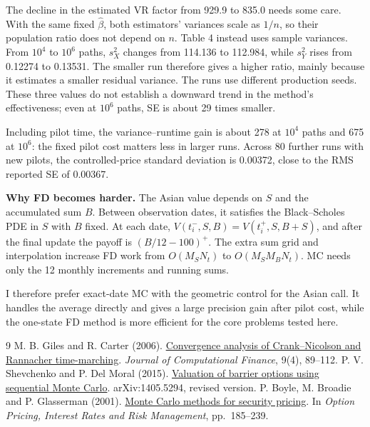 \documentclass[12pt]{article}
\theoremstyle{definition}
\begin{document}
The decline in the estimated VR factor from 929.9 to 835.0 needs some care.
With the same fixed $\widehat\beta$, both estimators' variances scale as $1/n$, so
their population ratio does not depend on $n$. Table 4 instead uses sample
variances. From $10^4$ to $10^6$ paths, $s_X^2$ changes from 114.136 to 112.984,
while $s_Y^2$ rises from 0.12274 to 0.13531. The smaller run therefore gives a
higher ratio, mainly because it estimates a smaller residual variance. The runs use
different production seeds. These three values do not establish a downward trend
in the method's effectiveness; even at $10^6$ paths, SE is about 29 times smaller.

Including pilot time, the variance--runtime gain is about 278 at $10^4$ paths and
675 at $10^6$: the fixed pilot cost matters less in larger runs. Across 80 further
runs with new pilots, the controlled-price standard deviation is 0.00372, close to
the RMS reported SE of 0.00367.

\textbf{Why FD becomes harder.} The Asian value depends on $S$ and the accumulated
sum $B$. Between observation dates, it satisfies the Black--Scholes PDE in $S$
with $B$ fixed. At each date, $V(t_i^-,S,B)=V(t_i^+,S,B+S)$, and after the final
update the payoff is $(B/12-100)^+$. The extra sum grid and interpolation increase
FD work from $O(M_SN_t)$ to $O(M_SM_BN_t)$. MC needs only the 12 monthly
increments and running sums.

I therefore prefer exact-date MC with the geometric control for the Asian call.
It handles the average directly and gives a large precision gain after pilot cost,
while the one-state FD method is more efficient for the core problems tested here.

\begin{thebibliography}{9}
\setlength{\itemsep}{0pt}
 M. B. Giles and R. Carter (2006).
\href{https://people.maths.ox.ac.uk/gilesm/files/giles_carter.pdf}{Convergence analysis
of Crank--Nicolson and Rannacher time-marching}.
\emph{Journal of Computational Finance}, 9(4), 89--112.
 P. V. Shevchenko and P. Del Moral (2015).
\href{https://arxiv.org/abs/1405.5294}{Valuation of barrier options using sequential
Monte Carlo}. arXiv:1405.5294, revised version.
 P. Boyle, M. Broadie and P. Glasserman (2001).
\href{https://business.columbia.edu/faculty/research/monte-carlo-methods-security-pricing-0}{Monte Carlo methods for security pricing}.
In \emph{Option Pricing, Interest Rates and Risk Management}, pp.\ 185--239.
\end{thebibliography}
\end{document}
